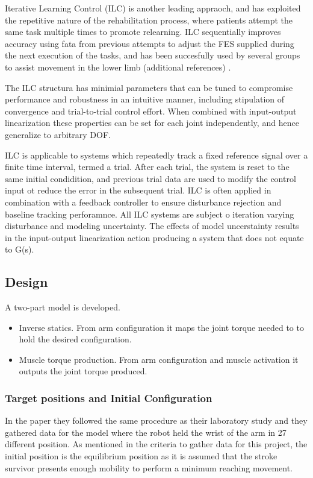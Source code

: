 Iterative Learning Control (ILC) is another leading appraoch, and has exploited the repetitive nature of the rehabilitation process, where patients attempt the same task multiple times to promote relearning. ILC sequentially improves accuracy using fata from previous attempts to adjust the FES supplied during the next execution of the tasks, and has been succesfully used by several groups to assist movement in the lower limb (additional references) \cite{IOL}.

The ILC structura has minimial parameters that can be tuned to compromise performance and robustness in an intuitive manner, including stipulation of convergence and trial-to-trial control effort. When combined with input-output linearization these properties can be set for each joint independently, and hence generalize to arbitrary DOF. \cite{IOL}

ILC is applicable to systems which repeatedly track a fixed reference signal over a finite time interval, termed a trial. 
After each trial, the system is reset to the same initial condidition, and previous trial data are used to modify the control input ot reduce the error in the subsequent trial. ILC is often applied in combination with a feedback controller to ensure disturbance rejection and baseline tracking perforamnce. All ILC systems are subject o iteration varying disturbance and modeling uncertainty. The effects of model uncerstainty results in the input-output linearization action producing a system that does not equate to G(s). 



\subsection{Design}
A two-part model is developed.
\begin{itemize}
    \item Inverse statics. From arm configuration it maps the joint torque needed to to hold the desired configuration.
    \item Muscle torque production. From arm configuration and muscle activation it outputs the joint torque produced. 
\end{itemize}

\subsubsection{Target positions and Initial Configuration}
In the paper \cite{QSC} they followed the same procedure as their laboratory study and they gathered data for the model where the robot held the wrist of the arm in 27 different position. As mentioned in the criteria to gather data for this project, the initial position is the equilibrium position as it is assumed that the stroke survivor presents enough mobility to perform a minimum reaching movement. 

